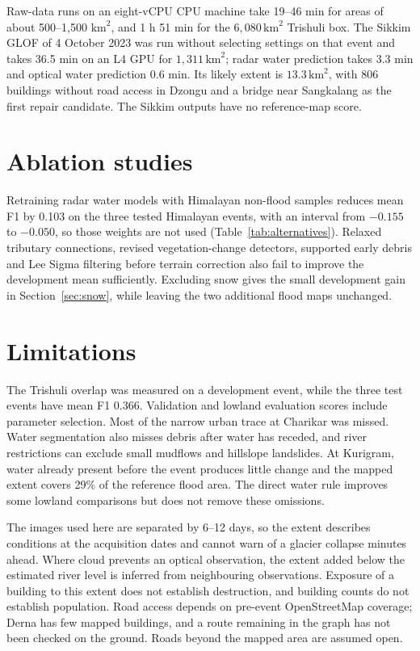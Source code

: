 \documentclass[10pt,twocolumn,letterpaper]{article}
\newcommand{\km}{\,\mathrm{km}}
\begin{document}
Raw-data runs on an eight-vCPU CPU machine take 19--46 min for areas of about 500--1,500
$\mathrm{km}^2$, and 1 h 51 min for the $6{,}080\km^2$ Trishuli box. The Sikkim GLOF of 4 October
2023 was run without selecting settings on that event and takes 36.5 min on an L4 GPU for
$1{,}311\km^2$; radar water prediction takes 3.3 min and optical water prediction 0.6 min. Its
likely extent is $13.3\km^2$, with 806 buildings without road access in Dzongu and a bridge near
Sangkalang as the first repair candidate. The Sikkim outputs have no reference-map score.

\section{Ablation studies}
Retraining radar water models with Himalayan non-flood samples reduces mean F1 by 0.103 on the
three tested Himalayan events, with an interval from $-0.155$ to $-0.050$, so those weights are not
used (Table~\ref{tab:alternatives}). Relaxed tributary connections, revised vegetation-change
detectors, supported early debris and Lee Sigma filtering before terrain correction also fail to
improve the development mean sufficiently. Excluding snow gives the small development gain in
Section~\ref{sec:snow}, while leaving the two additional flood maps unchanged.



\section{Limitations}
The Trishuli overlap was measured on a development event, while the three test events have mean F1
0.366. Validation and lowland evaluation scores include parameter selection. Most of the narrow
urban trace at Charikar was missed. Water segmentation also misses debris after water has receded,
and river restrictions can exclude small mudflows and hillslope landslides. At Kurigram, water
already present before the event produces little change and the mapped extent covers 29\% of the
reference flood area. The direct water rule improves some lowland comparisons but does not remove
these omissions.

The images used here are separated by 6--12 days, so the extent describes conditions at the
acquisition dates and cannot warn of a glacier collapse minutes ahead. Where cloud prevents an
optical observation, the extent added below the estimated river level is inferred from neighbouring
observations. Exposure of a building to this extent does not establish destruction, and building
counts do not establish population. Road access depends on pre-event OpenStreetMap coverage; Derna
has few mapped buildings, and a route remaining in the graph has not been checked on the ground.
Roads beyond the mapped area are assumed open.
\end{document}
